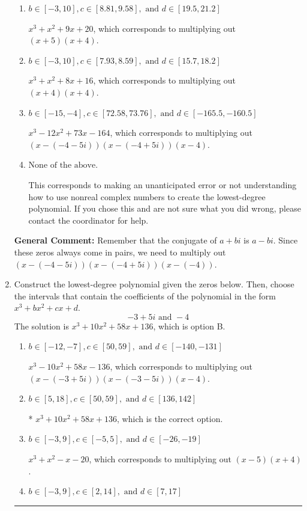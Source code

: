 \documentclass{extbook}[14pt]
\newcommand{\litem}[1]{\item #1

\rule{\textwidth}{0.4pt}}
\begin{document}
\begin{enumerate}
{\begin{enumerate}[label=\Alph*.]
* $x^{3} +12 x^{2} +73 x + 164$, which is the correct option.
\item \( b \in [-3, 10], c \in [8.81, 9.58], \text{ and } d \in [19.5, 21.2] \)

$x^{3} + x^{2} +9 x + 20$, which corresponds to multiplying out $(x + 5)(x + 4)$.
\item \( b \in [-3, 10], c \in [7.93, 8.59], \text{ and } d \in [15.7, 18.2] \)

$x^{3} + x^{2} +8 x + 16$, which corresponds to multiplying out $(x + 4)(x + 4)$.
\item \( b \in [-15, -4], c \in [72.58, 73.76], \text{ and } d \in [-165.5, -160.5] \)

$x^{3} -12 x^{2} +73 x -164$, which corresponds to multiplying out $(x-(-4 - 5 i))(x-(-4 + 5 i))(x -4)$.
\item \( \text{None of the above.} \)

This corresponds to making an unanticipated error or not understanding how to use nonreal complex numbers to create the lowest-degree polynomial. If you chose this and are not sure what you did wrong, please contact the coordinator for help.
\end{enumerate}

\textbf{General Comment:} Remember that the conjugate of $a+bi$ is $a-bi$. Since these zeros always come in pairs, we need to multiply out $(x-(-4 - 5 i))(x-(-4 + 5 i))(x-(-4))$.
}
\litem{
Construct the lowest-degree polynomial given the zeros below. Then, choose the intervals that contain the coefficients of the polynomial in the form $x^3+bx^2+cx+d$.
\[ -3 + 5 i \text{ and } -4 \]The solution is \( x^{3} +10 x^{2} +58 x + 136 \), which is option B.\begin{enumerate}[label=\Alph*.]
\item \( b \in [-12, -7], c \in [50, 59], \text{ and } d \in [-140, -131] \)

$x^{3} -10 x^{2} +58 x -136$, which corresponds to multiplying out $(x-(-3 + 5 i))(x-(-3 - 5 i))(x -4)$.
\item \( b \in [5, 18], c \in [50, 59], \text{ and } d \in [136, 142] \)

* $x^{3} +10 x^{2} +58 x + 136$, which is the correct option.
\item \( b \in [-3, 9], c \in [-5, 5], \text{ and } d \in [-26, -19] \)

$x^{3} + x^{2} -x -20$, which corresponds to multiplying out $(x -5)(x + 4)$.
\item \( b \in [-3, 9], c \in [2, 14], \text{ and } d \in [7, 17] \)


\end{enumerate}}
\end{enumerate}
\end{document}
